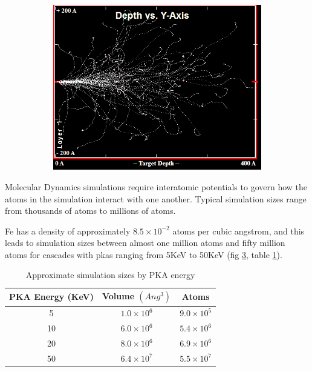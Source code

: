 \begin{figure}
\begin{subfigure}{.5\textwidth}
  \caption{} \label{fig:damagecascade5kev}
\end{subfigure}
\begin{subfigure}{.5\textwidth}
  \centering
  \includegraphics[width=.7\linewidth]{chapters/introduction/images/50KeV.png}
  \caption{} \label{fig:damagecascade10kev}
\end{subfigure}
\label{fig:damagecascades}
\end{figure}


\FloatBarrier

Molecular Dynamics simulations require interatomic potentials to govern how the atoms in the simulation interact with one another.  Typical simulation sizes range from thousands of atoms to millions of atoms.

Fe has a density of approximately $8.5 \times 10^{-2}$ atoms per cubic angstrom, and this leads to simulation sizes between almost one million atoms and fifty million atoms for cascades with \acrshort{pka}s ranging from 5KeV to 50KeV (fig \ref{fig:damagecascades}, table \ref{table:fesimulationsize}).

\begin{table}[h]
\begin{center}
\renewcommand{\arraystretch}{1.2}
\begin{tabular}{c c c}
\hline\hline
PKA Energy (KeV) & Volume $(Ang^3)$ & Atoms \\
\hline\hline
5 & $1.0\times 10^6$ & $9.0\times 10^5$ \\
10 & $6.0\times 10^6$ & $5.4\times 10^6$ \\
20 & $8.0\times 10^6$ & $6.9\times 10^6$ \\
50 & $6.4\times 10^7$ & $5.5\times 10^7$ \\
\hline\hline
\end{tabular}
\end{center}
\caption{Approximate simulation sizes by PKA energy}
\label{table:fesimulationsize}
\end{table}

